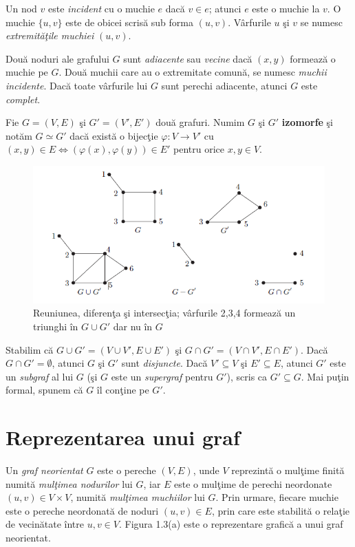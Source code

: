 \documentclass[11pt,a4paper]{report}
\begin{document}
	Un nod $v$ este \textit{incident} cu o muchie $e$ dac\u a $v\in e$; atunci $e$ este o muchie la $v$. O muchie $\{u,v\}$ este de obicei scris\u a sub forma $(u,v)$. V\^ arfurile $u$ \c si $v$ se numesc \textit{extremit\u a\c tile muchiei} $(u,v)$. 
	
	Dou\u a noduri ale grafului $G$ sunt \textit{adiacente} sau \textit{vecine} dac\u a $(x,y)$ formeaz\u a o muchie pe $G$. Dou\u a muchii care au o extremitate comun\u a, se numesc \textit{muchii incidente}. Dac\u a toate v\^ arfurile lui $G$ sunt perechi adiacente, atunci $G$ este \textit{complet}. 
	
	Fie $G=(V,E)$ \c si $G'=(V',E')$ dou\u a grafuri. Numim $G$  \c si  $G'$  \textbf{izomorfe} \c si not\u am $G\simeq G'$ dac\u a exist\u a o bijec\c tie $\varphi :V\rightarrow V'$ cu $(x,y)\in E  \Leftrightarrow (\varphi (x),\varphi (y)) \in E'$ pentru orice $x,y\in V$.
	
	\begin{figure}[!hbt]
		\centering
		\includegraphics[width=12.2cm]{Figura2.png}
		\caption{Reuniunea, diferen\c ta \c si intersec\c tia; v\^ arfurile 2,3,4 \centering \newline formeaz\u a un triunghi \^ in $G\cup G'$ dar nu \^ in $G$}
	\end{figure}
	
	
	Stabilim c\u a $G\cup G'=(V\cup V',E\cup E')$ \c si $G\cap G'=(V\cap V',E\cap E')$. Dac\u a $G\cap G'=\emptyset$, atunci $G$ \c si $G'$ sunt \textit{disjuncte}. Dac\u a $V'\subseteq V$ \c si $E'\subseteq E$, atunci $G'$ este un \textit{subgraf} al lui $G$ (\c si $G$ este un \textit{supergraf} pentru $G'$), scris ca $G'\subseteq G$. Mai pu\c tin formal, spunem c\u a $G$ \^ il con\c tine pe $G'$.
	 
    \section{Reprezentarea unui graf}
	Un \textit{graf neorientat} \cite{AM} $G$ este o pereche $(V,E)$, unde $V$ reprezint\u a o mul\c time finit\u a numit\u a \textit{mul\c timea nodurilor} lui $G$, iar $E$ este o mul\c time de perechi neordonate $(u,v)\in V\times V$, numit\u a \textit{mul\c timea muchiilor} lui $G$. Prin urmare, fiecare muchie este o pereche neordonat\u a de noduri $(u,v)\in E$, prin care este stabilit\u a o rela\c tie de vecin\u atate \^ intre $u,v\in V$. Figura 1.3(a) este o reprezentare grafic\u a a unui graf neorientat.
\end{document}
